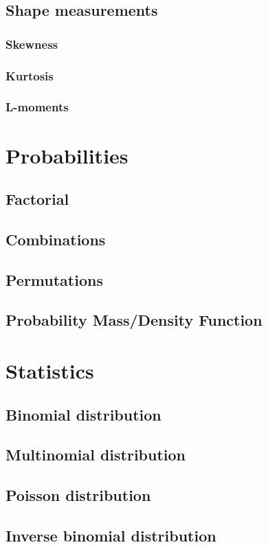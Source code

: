 \documentclass{report}
\begin{document}
	\section{Shape measurements}
		\subsection{Skewness}
		\subsection{Kurtosis}
		\subsection{L-moments}

\chapter{Probabilities}
	\section{Factorial}
	\section{Combinations}
	\section{Permutations}
	\section{Probability Mass/Density Function}

\chapter{Statistics}
	\section{Binomial distribution}
	\section{Multinomial distribution}
	\section{Poisson distribution}
	\section{Inverse binomial distribution}
\end{document}

